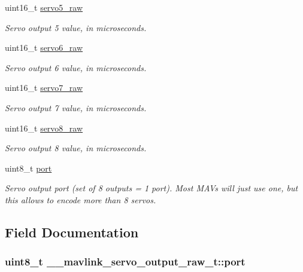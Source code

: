 \begin{DoxyCompactItemize}
uint16\+\_\+t \hyperlink{struct____mavlink__servo__output__raw__t_a2cc4f07c7398f753b56acd16f195df6a}{servo5\+\_\+raw}
\begin{DoxyCompactList}\small\item\em Servo output 5 value, in microseconds. \end{DoxyCompactList}\item 
uint16\+\_\+t \hyperlink{struct____mavlink__servo__output__raw__t_a101f4294794034f15a5afe3a1e980b2e}{servo6\+\_\+raw}
\begin{DoxyCompactList}\small\item\em Servo output 6 value, in microseconds. \end{DoxyCompactList}\item 
uint16\+\_\+t \hyperlink{struct____mavlink__servo__output__raw__t_acc5571463987b3d5079ab1afb2556895}{servo7\+\_\+raw}
\begin{DoxyCompactList}\small\item\em Servo output 7 value, in microseconds. \end{DoxyCompactList}\item 
uint16\+\_\+t \hyperlink{struct____mavlink__servo__output__raw__t_a1bf5dcc6a436529fc0d89ebf56d2a980}{servo8\+\_\+raw}
\begin{DoxyCompactList}\small\item\em Servo output 8 value, in microseconds. \end{DoxyCompactList}\item 
uint8\+\_\+t \hyperlink{struct____mavlink__servo__output__raw__t_aa82c0841e17f4206e8b78c324ad407aa}{port}
\begin{DoxyCompactList}\small\item\em Servo output port (set of 8 outputs = 1 port). Most M\+A\+Vs will just use one, but this allows to encode more than 8 servos. \end{DoxyCompactList}\end{DoxyCompactItemize}


\subsection{Field Documentation}
\hypertarget{struct____mavlink__servo__output__raw__t_aa82c0841e17f4206e8b78c324ad407aa}{
\subsubsection[{port}]{\setlength{\rightskip}{0pt plus 5cm}uint8\+\_\+t \+\_\+\+\_\+mavlink\+\_\+servo\+\_\+output\+\_\+raw\+\_\+t\+::port}}\label{struct____mavlink__servo__output__raw__t_aa82c0841e17f4206e8b78c324ad407aa}


